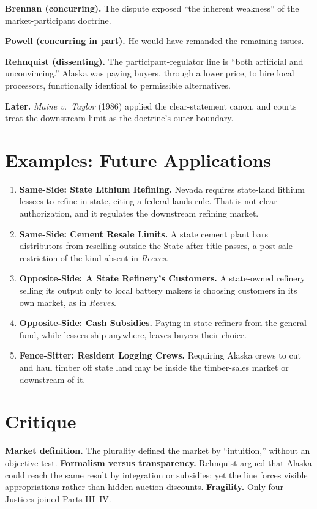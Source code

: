 \documentclass[12pt]{article}
\begin{document}
\textbf{Brennan (concurring).} The dispute exposed ``the inherent weakness'' of the market-participant doctrine.

\textbf{Powell (concurring in part).} He would have remanded the remaining issues.

\textbf{Rehnquist (dissenting).} The participant-regulator line is ``both artificial and unconvincing.'' Alaska was paying buyers, through a lower price, to hire local processors, functionally identical to permissible alternatives.

\textbf{Later.} \textit{Maine v.\ Taylor} (1986) applied the clear-statement canon, and courts treat the downstream limit as the doctrine's outer boundary.

\section{Examples: Future Applications}

\begin{enumerate}
\item \textbf{Same-Side: State Lithium Refining.} Nevada requires state-land lithium lessees to refine in-state, citing a federal-lands rule. That is not clear authorization, and it regulates the downstream refining market.
\item \textbf{Same-Side: Cement Resale Limits.} A state cement plant bars distributors from reselling outside the State after title passes, a post-sale restriction of the kind absent in \textit{Reeves}.
\item \textbf{Opposite-Side: A State Refinery's Customers.} A state-owned refinery selling its output only to local battery makers is choosing customers in its own market, as in \textit{Reeves}.
\item \textbf{Opposite-Side: Cash Subsidies.} Paying in-state refiners from the general fund, while lessees ship anywhere, leaves buyers their choice.
\item \textbf{Fence-Sitter: Resident Logging Crews.} Requiring Alaska crews to cut and haul timber off state land may be inside the timber-sales market or downstream of it.
\end{enumerate}

\section{Critique}

\textbf{Market definition.} The plurality defined the market by ``intuition,'' without an objective test. \textbf{Formalism versus transparency.} Rehnquist argued that Alaska could reach the same result by integration or subsidies; yet the line forces visible appropriations rather than hidden auction discounts. \textbf{Fragility.} Only four Justices joined Parts III--IV.
\end{document}
